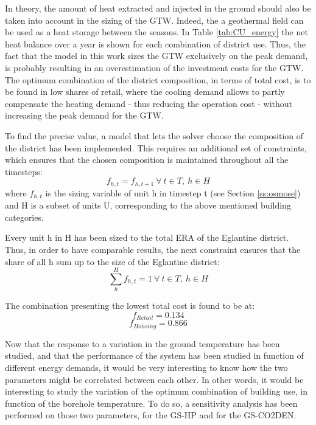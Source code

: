 \documentclass{article}
\begin{document}
In theory, the amount of heat extracted and injected in the ground should also be taken into account in the sizing of the GTW. Indeed, the a geothermal field can be used as a heat storage between the seasons. In Table \ref{tab:CU_energy} the net heat balance over a year is shown for each combination of district use. Thus, the fact that the model in this work sizes the GTW exclusively on the peak demand, is probably resulting in an overestimation of the investment costs for the GTW. \\

The optimum combination of the district composition, in terms of total cost, is to be found in low shares of retail, where the cooling demand allows to partly compensate the heating demand - thus reducing the operation cost - without increasing the peak demand for the GTW.

To find the precise value, a model that lets the solver choose the composition of the district has been implemented. This requires an additional set of constraints, which ensures that the chosen composition is maintained throughout all the timesteps:
\begin{equation}
f_{h,t} = f_{h,t+1} \ \forall \ t \in T, \ h \in H
\end{equation}
where $f_{h,t}$ is the sizing variable of unit h in timestep t (see Section \ref{ss:osmose}) and H is a subset of units U, corresponding to the above mentioned building categories.

Every unit h in H has been sized to the total ERA of the Eglantine district. Thus, in order to have comparable results, the next constraint ensures that the share of all h sum up to the size of the Eglantine district:
\begin{equation}
\sum_{h}^{H} f_{h,t} = 1 \ \forall \ t \in T, \ h \in H
\end{equation}

The combination presenting the lowest total cost is found to be at:
$$f_{Retail} = 0.134$$
$$f_{Housing} = 0.866$$

Now that the response to a variation in the ground temperature has been studied, and that the performance of the system has been studied in function of different energy demands, it would be very interesting to know how the two parameters might be correlated between each other. In other words, it would be interesting to study the variation of the optimum combination of building use, in function of the borehole temperature. 
To do so, a sensitivity analysis has been performed on those two parameters, for the GS-HP and for the GS-CO2DEN. 
\end{document}

